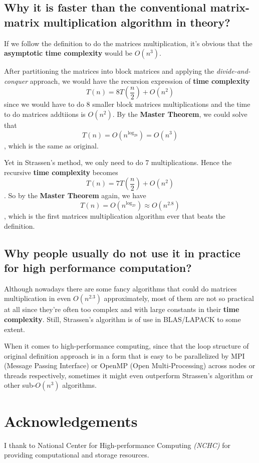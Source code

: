 \documentclass[12pt, a4paper]{article}
\begin{document}
\subsection{Why it is faster than the conventional matrix-matrix multiplication algorithm in theory?}

If we follow the definition to do the matrices multiplication, it's obvious that the \textbf{asymptotic time complexity} would be $O(n^3)$.

After partitioning the matrices into block matrices and applying the \textit{divide-and-conquer} approach, we would have the recursion expression of \textbf{time complexity} $$T(n)=8T(\frac{n}{2})+O(n^2)$$ since we would have to do 8 smaller block matrices multiplications and the time to do matrices addtiions is $O(n^2)$. By the \textbf{Master Theorem}, we could solve that $$T(n)=O(n^{\log_28})=O(n^3)$$, which is the same as original.

Yet in Strassen's method, we only need to do 7 multiplications. Hence the recursive \textbf{time complexity} becomes $$T(n)=7T(\frac{n}{2})+O(n^2)$$. So by the \textbf{Master Theorem} again, we have $$T(n)=O(n^{\log_27})\approx O(n^{2.8})$$, which is the first matrices multiplication algorithm ever that beats the definition.

\subsection{Why people usually do not use it in practice for high performance computation?}

Although nowadays there are some fancy algorithms that could do matrices multiplication in even $O(n^{2.3})$ approximately, most of them are not so practical at all since they're often too complex and with large constants in their \textbf{time complexity}. Still, Strassen's algorithm is of use in \textsf{BLAS}/\textsf{LAPACK} to some extent.

When it comes to high-performance computing, since that the loop structure of original definition approach is in a form that is easy to be parallelized by \textsf{MPI (Message Passing Interface)} or \textsf{OpenMP (Open Multi-Processing)} across nodes or threads respectively, sometimes it might even outperform Strassen's algorithm or other sub-$O(n^3)$ algorithms.

\section*{Acknowledgements}

I thank to \textsf{National Center for High-performance Computing} \textit{(NCHC)} for providing computational and storage resources.
\end{document}
